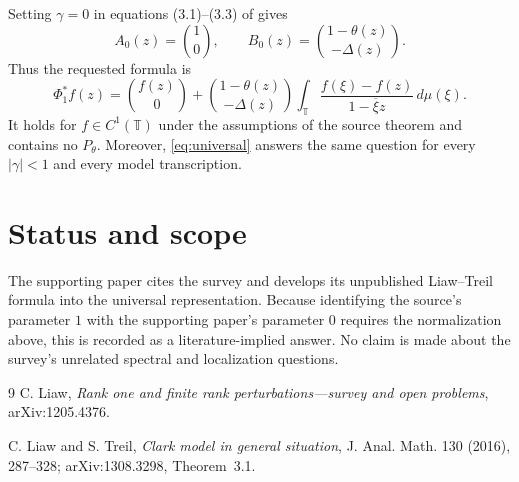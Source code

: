\documentclass[11pt]{article}
\newcommand{\T}{\mathbb T}
\newcommand{\Dlt}{\Delta}
\begin{document}
Setting $\gamma=0$ in equations (3.1)--(3.3) of \cite{LT13} gives
\[
 A_0(z)=\binom{1}{0},\qquad
 B_0(z)=\binom{1-\theta(z)}{-\Dlt(z)}.
\]
Thus the requested formula is
\begin{equation}\label{eq:answer}
 \boxed{\displaystyle
 \Phi_1^*f(z)=\binom{f(z)}{0}
 +\binom{1-\theta(z)}{-\Dlt(z)}
 \int_\T\frac{f(\xi)-f(z)}{1-\overline\xi z}\,d\mu(\xi).}
\end{equation}
It holds for $f\in C^1(\T)$ under the assumptions of the source theorem and
contains no $P_\theta$.  Moreover, \eqref{eq:universal} answers the same
question for every $|\gamma|<1$ and every model transcription.

\section{Status and scope}

The supporting paper cites the survey and develops its unpublished
Liaw--Treil formula into the universal representation.  Because identifying
the source's parameter $1$ with the supporting paper's parameter $0$ requires
the normalization above, this is recorded as a literature-implied answer.
No claim is made about the survey's unrelated spectral and localization
questions.

\begin{thebibliography}{9}
C. Liaw, \emph{Rank one and finite rank perturbations---survey and open
problems}, arXiv:1205.4376.

C. Liaw and S. Treil, \emph{Clark model in general situation},
J. Anal. Math. 130 (2016), 287--328; arXiv:1308.3298, Theorem~3.1.
\end{thebibliography}
\end{document}
